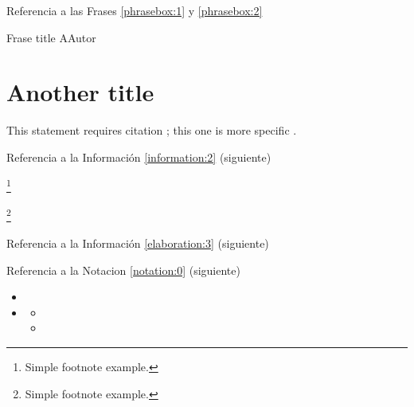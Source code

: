 \lipsum[1][1-5]

Referencia a las Frases \ref{phrasebox:1} y \ref{phrasebox:2} 

\begin{phrasebox}{Frase title A}{Autor}
\label{phrasebox:1}
\lipsum[1][1-2] 
\end{phrasebox}

\lipsum[1][1-3] 

\begin{citationbox}
\lipsum[1][1-3] 
\end{citationbox}

\lipsum[1][1-3] 

\section{Another title}

This statement requires citation \cite{book_key}; this one is more specific \cite[122]{article_key}.
\lipsum[1][1-4]
 
Referencia a la Información \ref{information:2} (siguiente)

\begin{informationbox}[Título B]
\label{information:2}
\lipsum[1][1-3]\footnote{Simple footnote example.}
\end{informationbox}

\lipsum[1] %

\begin{attentionbox}
\label{attentionbox:a}
\lipsum[1][1-3]\footnote{Simple footnote example.}
\end{attentionbox}

\lipsum[1] %

Referencia a la Información \ref{elaboration:3} (siguiente)

\begin{elaboration}[Título C]
\label{elaboration:3}
\lipsum[1][1-3] 
\end{elaboration}

\lipsum[1][1-3] %


Referencia a la Notacion \ref{notation:0} (siguiente)

\begin{notation}[Título C]
\label{notation:0}
\lipsum[1][1-2]
\begin{itemize}
\item \lipsum[1][1-2]
\item \lipsum[1][1-2]
\begin{itemize}
\item \lipsum[1][1-2]
\item \lipsum[1][1-2]
\end{itemize}
\end{itemize}
\end{notation}

